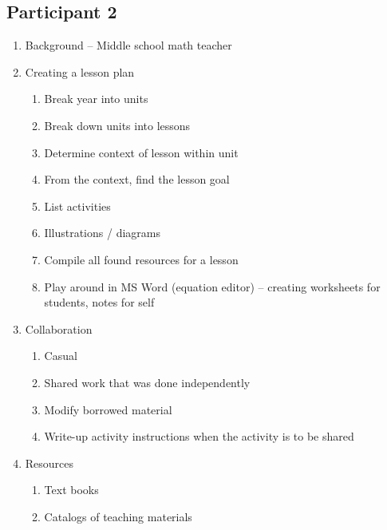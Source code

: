 \subsection{Participant 2}
\begin{enumerate}
	\item Background -- Middle school math teacher

	\item Creating a lesson plan
		\begin{enumerate}
			\item Break year into units

			\item Break down units into lessons

			\item Determine context of lesson within unit

			\item From the context, find the lesson goal

			\item List activities

			\item Illustrations / diagrams

			\item Compile all found resources for a lesson

			\item Play around in MS Word (equation editor) -- creating
				worksheets for students, notes for self

		\end{enumerate}

	\item Collaboration
		\begin{enumerate}
			\item Casual

			\item Shared work that was done independently

			\item Modify borrowed material

			\item Write-up activity instructions when the activity is to be
				shared

		\end{enumerate}

	\item Resources
		\begin{enumerate}
			\item Text books

			\item Catalogs of teaching materials


\end{enumerate}
\end{enumerate}
